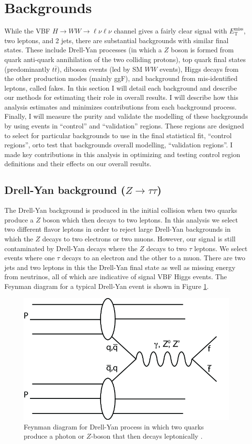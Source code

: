 \section{Backgrounds}
While the VBF $H\rightarrow WW\rightarrow \ell\nu\ell\nu$ channel gives a fairly clear signal with $E_{\text{T}}^{\text{miss}}$, two leptons, and 2 jets, there are substantial backgrounds with similar final states. These include Drell-Yan processes (in which a $Z$ boson is formed from quark anti-quark annihilation of the two colliding protons), top quark final states (predominantly $t\bar{t}$), diboson events (led by SM $WW$ events), Higgs decays from the other production modes (mainly ggF), and background from mis-identified leptons, called fakes. In this section I will detail each background and describe our methods for estimating their role in overall results. I will describe how this analysis estimates and minimizes contributions from each background process. Finally, I will measure the purity and validate the modelling of these backgrounds by using events in ``control'' and ``validation'' regions. These regions are designed to select for particular backgrounds to use in the final statistical fit, ``control regions'', orto test that backgrounds overall modelling, ``validation regions''.  I made key contributions in this analysis in optimizing and testing control region definitions and their effects on our overall results. 

\subsection{Drell-Yan background ($Z\rightarrow \tau\tau$)}
The Drell-Yan background is produced in the initial collision when two quarks produce a $Z$ boson which then decays to two leptons. In this analysis we select two different flavor leptons in order to reject large Drell-Yan backgrounds in which the $Z$ decays to two electrons or two muons. However, our signal is still contaminated by Drell-Yan decays where the $Z$ decays to two $\tau$ leptons. We select events where one $\tau$ decays to an electron and the other to a muon. There are two jets and two leptons in this the Drell-Yan final state as well as missing energy from neutrinos, all of which are indicative of signal VBF Higgs events. The Feynman diagram for a typical Drell-Yan event is shown in Figure \ref{fig:DrellYan}. 

\begin{figure}
\centering
  \includegraphics[width=.35\linewidth]{Pictures/FeynmanDrellYan.png}
\caption{Feynman diagram for Drell-Yan process in which two quarks produce a photon or $Z$-boson that then decays leptonically \cite{DrellYan}.}
\label{fig:DrellYan}
\end{figure}

